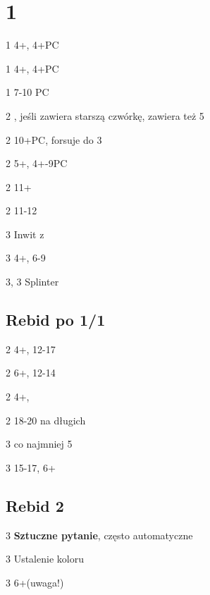 \documentclass[12pt, a4paper]{article}
\begin{document}
\section*{1\diams}
\sequence{{1\diams}}
\begin{options}[2]
    \item[1\hearts] 4+\hearts, 4+PC
    \item[1\spades] 4+\spades, 4+PC
    \item[1\nt] 7-10 PC
    \item[2\clubs] \gf, jeśli zawiera starszą czwórkę, zawiera też 5\clubs
    \item[2\diams] 10+PC, forsuje do 3\diams
    \item[2\hearts] 5+\spades, 4+-9PC
    \item[2\spades] 11+ \bal 
    \item[2\nt] 11-12
    \item[3\clubs] Inwit z \clubs
    \item[3\diams] 4+\diams, 6-9
    \item[3\hearts, 3\spades] Splinter          
\end{options}


\subsection*{Rebid po 1/1}
\sequence{{1\diams}{1\hearts}}
\begin{options}[1]
    \item[2\clubs] 4+\clubs, 12-17
    \item[2\diams] 6+\diams, 12-14
    \item[2\spades] 4+\spades, \gf
    \item[2\nt] 18-20 \bal \orr \gf na długich \diams
    \item[3\clubs] co najmniej 5\clubs \gf
    \item[3\diams] 15-17, 6+\diams    
\end{options}

\subsection*{Rebid 2\nt}
\sequence{{1\diams}{1\hearts}{2\ntx}}
\begin{options}[2]
    \item[3\clubs] \textbf{Sztuczne pytanie}, często automatyczne \vimp
    \item[3\diams] Ustalenie koloru
    \item[3\hearts] 6+\hearts (uwaga!)
\end{options}
\end{document}
